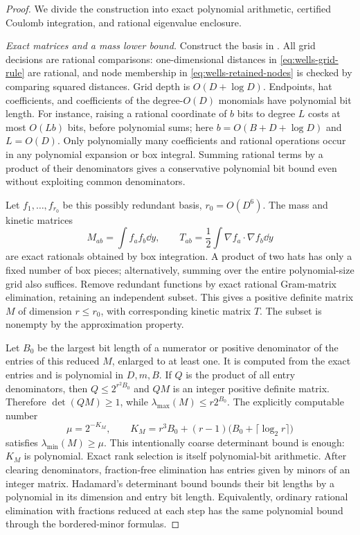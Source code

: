 \begin{proof}
We divide the construction into exact polynomial arithmetic,
certified Coulomb integration, and rational eigenvalue enclosure.

\smallskip\noindent
\emph{Exact matrices and a mass lower bound.}
Construct the basis in .
All grid decisions are rational comparisons: one-dimensional distances
in \eqref{eq:wells-grid-rule} are rational, and node membership in
\eqref{eq:wells-retained-nodes} is checked by comparing squared
distances. Grid depth is \(O(D+\log D)\). Endpoints, hat coefficients,
and coefficients of the degree-\(O(D)\) monomials have polynomial
bit length. For instance, raising a rational coordinate of \(b\)
bits to degree \(L\) costs at most \(O(Lb)\) bits, before polynomial
sums; here \(b=O(B+D+\log D)\) and \(L=O(D)\).
Only polynomially many coefficients and rational operations occur
in any polynomial expansion or box integral. Summing rational terms
by a product of their denominators gives a conservative polynomial
bit bound even without exploiting common denominators.

Let \(f_1,\ldots,f_{r_0}\) be this possibly redundant basis,
\(r_0=O(D^6)\). The mass and kinetic matrices
\begin{equation}
 M_{ab}=\int f_af_b\dd y,\qquad
 T_{ab}=\frac12\int\nabla f_a\cdot\nabla f_b\dd y
 \label{eq:wells-exact-matrices}
\end{equation}
are exact rationals obtained by box integration. A product of two
hats has only a fixed number of box pieces; alternatively, summing
over the entire polynomial-size grid also suffices.
Remove redundant functions by exact rational Gram-matrix elimination,
retaining an independent subset. This gives a positive definite
matrix \(M\) of dimension \(r\le r_0\), with corresponding kinetic
matrix \(T\). The subset is nonempty by the approximation property.

Let \(B_0\) be the largest bit length of a numerator or positive
denominator of the entries of this reduced \(M\), enlarged to at
least one. It is computed from the exact entries and is polynomial
in \(D,m,B\). If \(Q\) is the product of all entry denominators,
then \(Q\le2^{r^2B_0}\) and \(QM\) is an integer positive definite
matrix. Therefore \(\det(QM)\ge1\), while
\(\lambda_{\max}(M)\le r2^{B_0}\). The explicitly computable number
\begin{equation}
 \mu=2^{-K_M},\qquad
 K_M=r^3B_0+(r-1)\bigl(B_0+\lceil\log_2r\rceil\bigr)
 \label{eq:wells-mass-lower}
\end{equation}
satisfies \(\lambda_{\min}(M)\ge\mu\).
This intentionally coarse determinant bound is enough: \(K_M\)
is polynomial. Exact rank selection is itself polynomial-bit
arithmetic. After clearing denominators, fraction-free elimination
has entries given by minors of an integer matrix. Hadamard's
determinant bound bounds their bit lengths by a polynomial in its
dimension and entry bit length. Equivalently, ordinary rational
elimination with fractions reduced at each step has the same
polynomial bound through the bordered-minor formulas.


\end{proof}
